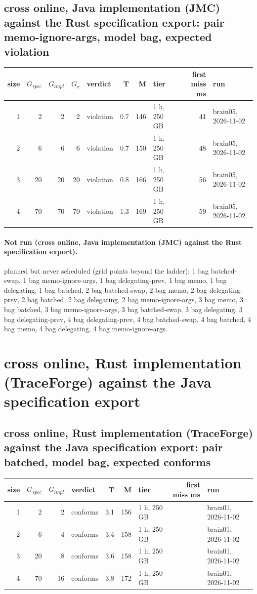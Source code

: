 \documentclass[10pt]{article}
\begin{document}
\subsection*{cross online, Java implementation (JMC) against the Rust specification export: pair \textsf{memo-ignore-args}, model bag, expected violation}
\begin{longtable}{@{}rrrrlrrlrl@{}}
\toprule
size & $G_{\mathit{spec}}$ & $G_{\mathit{impl}}$ & $G_x$ & verdict & T & M & tier & first miss ms & run \\
\midrule
\endhead
\color{red} 1 & 2 & 2 & 2 & violation & 0.7 & 146 & 1 h, 250 GB & 41 & brain05, 2026-11-02 \\
\color{red} 2 & 6 & 6 & 6 & violation & 0.7 & 150 & 1 h, 250 GB & 48 & brain05, 2026-11-02 \\
\color{red} 3 & 20 & 20 & 20 & violation & 0.8 & 166 & 1 h, 250 GB & 56 & brain05, 2026-11-02 \\
\color{red} 4 & 70 & 70 & 70 & violation & 1.3 & 169 & 1 h, 250 GB & 59 & brain05, 2026-11-02 \\
\bottomrule
\end{longtable}
\paragraph{Not run (cross online, Java implementation (JMC) against the Rust specification export).}
planned but never scheduled (grid points beyond the ladder): 1 bag batched-swap, 1 bag memo-ignore-args, 1 bag delegating-prev, 1 bag memo, 1 bag delegating, 1 bag batched, 2 bag batched-swap, 2 bag memo, 2 bag delegating-prev, 2 bag batched, 2 bag delegating, 2 bag memo-ignore-args, 3 bag memo, 3 bag batched, 3 bag memo-ignore-args, 3 bag batched-swap, 3 bag delegating, 3 bag delegating-prev, 4 bag delegating-prev, 4 bag batched-swap, 4 bag batched, 4 bag memo, 4 bag delegating, 4 bag memo-ignore-args.\par
\section*{cross online, Rust implementation (TraceForge) against the Java specification export}
\subsection*{cross online, Rust implementation (TraceForge) against the Java specification export: pair \textsf{batched}, model bag, expected conforms}
\begin{longtable}{@{}rrrlrrlrl@{}}
\toprule
size & $G_{\mathit{spec}}$ & $G_{\mathit{impl}}$ & verdict & T & M & tier & first miss ms & run \\
\midrule
\endhead
\color{red} 1 & 2 & 2 & conforms & 3.1 & 156 & 1 h, 250 GB &  & brain01, 2026-11-02 \\
\color{red} 2 & 6 & 4 & conforms & 3.4 & 158 & 1 h, 250 GB &  & brain01, 2026-11-02 \\
\color{red} 3 & 20 & 8 & conforms & 3.6 & 158 & 1 h, 250 GB &  & brain01, 2026-11-02 \\
\color{red} 4 & 70 & 16 & conforms & 3.8 & 172 & 1 h, 250 GB &  & brain01, 2026-11-02 \\
\bottomrule
\end{longtable}
\end{document}
